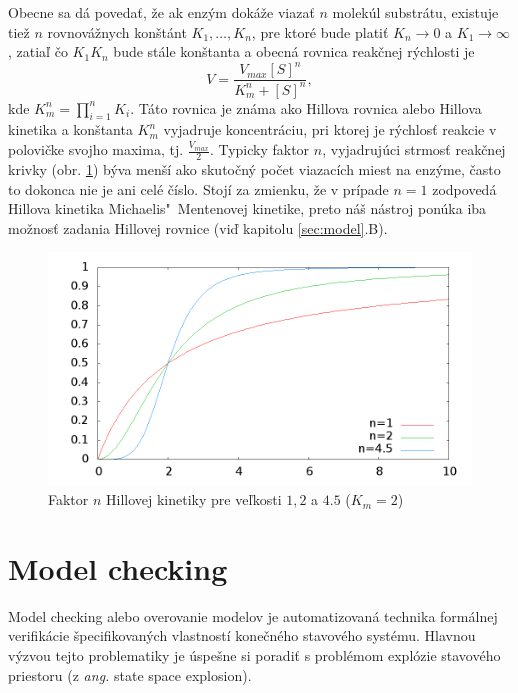 \documentclass[11pt,final,oneside]{fithesis}
\begin{document}
Obecne sa d\'a poveda\v t, \v ze ak enz\'ym dok\'a\v ze viaza\v t $n$ molek\'ul substr\'atu, existuje tie\v z $n$ rovnov\'a\v znych kon\v st\'ant
$K_1,\dots{},K_n$, pre ktor\'e bude plati\v t $K_n \rightarrow 0$ a $K_1 \rightarrow \infty$, zatia\v l \v co $K_1K_n$ bude st\'ale kon\v stanta a obecn\'a
rovnica reak\v cnej r\'ychlosti je
\begin{equation}
V = \frac{V_{max}[S]^n}{K_m^n + [S]^n},
\end{equation}
kde $K_m^n = \prod_{i=1}^n{K_i}$. T\'ato rovnica je zn\'ama ako Hillova rovnica alebo Hillova kinetika a kon\v stanta $K_m^n$ vyjadruje koncentr\'aciu, 
pri ktorej je r\'ychlos\v t reakcie v polovi\v cke svojho maxima, tj. $\frac{V_{max}}{2}$. Typicky faktor $n$, vyjadruj\'uci strmos\v t reak\v cnej krivky 
(obr. \ref{fig:factor})
b\'yva men\v s\'i ako skuto\v cn\'y po\v cet viazac\'ich miest na enz\'yme, \v casto to dokonca nie je ani cel\'e \v c\'islo. Stoj\'i za zmienku, \v ze 
v pr\'ipade $n = 1$ zodpoved\'a Hillova kinetika Michaelis"~Mentenovej kinetike, preto n\'a\v s n\'astroj pon\'uka iba mo\v znos\v t zadania Hillovej rovnice 
(vi\v d kapitolu \ref{sec:model}.B). \cite{Keener:1998:MP:Enzymes}
\begin{figure}[h]
	\centering
	\includegraphics[width=1\textwidth]{hill_factor}
	\caption{Faktor $n$ Hillovej kinetiky pre ve\v lkosti $1, 2$ a $4.5$ ($K_m = 2$)}
	\label{fig:factor}
\end{figure}

\section{Model checking}
\label{sec:modelChecking}
Model checking alebo overovanie modelov je automatizovan\'a technika form\'alnej verifik\'acie \v specifikovan\'ych vlastnost\'i kone\v cn\'eho stavov\'eho 
syst\'emu. Hlavnou v\'yzvou tejto problematiky je \'uspe\v sne si poradi\v t s probl\'emom expl\'ozie stavov\'eho priestoru (z \textit{ang.} state space
explosion).
\end{document}
